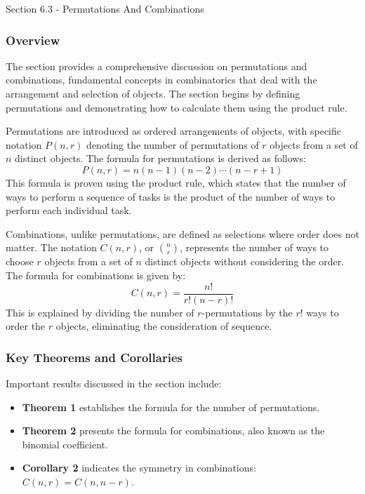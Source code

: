 \begin{notes}{Section 6.3 - Permutations And Combinations}
    \subsubsection*{Overview}

    The section provides a comprehensive discussion on permutations and combinations, fundamental concepts in combinatorics that deal with the arrangement and selection of objects. The section begins 
    by defining permutations and demonstrating how to calculate them using the product rule. \vspace*{1em}
    
    \begin{highlight}[Permutations]
        Permutations are introduced as ordered arrangements of objects, with specific notation $ P(n, r) $ denoting the number of permutations of $ r $ objects from a set of $ n $ distinct 
        objects. The formula for permutations is derived as follows:
        \begin{equation*}
            P(n, r) = n(n - 1)(n - 2) \cdots (n - r + 1)
        \end{equation*}
        This formula is proven using the product rule, which states that the number of ways to perform a sequence of tasks is the product of the number of ways to perform each individual task.
    \end{highlight}

    \begin{highlight}[Combinations]
        Combinations, unlike permutations, are defined as selections where order does not matter. The notation $ C(n, r) $, or $ \binom{n}{r} $, represents the number of ways to choose $ r $ 
        objects from a set of $ n $ distinct objects without considering the order. The formula for combinations is given by:
        \begin{equation*}
            C(n, r) = \frac{n!}{r!(n - r)!}
        \end{equation*}
        This is explained by dividing the number of $ r $-permutations by the $ r! $ ways to order the $ r $ objects, eliminating the consideration of sequence.
    \end{highlight}
    
    \subsubsection*{Key Theorems and Corollaries}
    Important results discussed in the section include:
    \begin{itemize}
        \item \textbf{Theorem 1} establishes the formula for the number of permutations.
        \item \textbf{Theorem 2} presents the formula for combinations, also known as the binomial coefficient.
        \item \textbf{Corollary 2} indicates the symmetry in combinations: $ C(n, r) = C(n, n - r) $.
    \end{itemize}
    

\end{notes}
